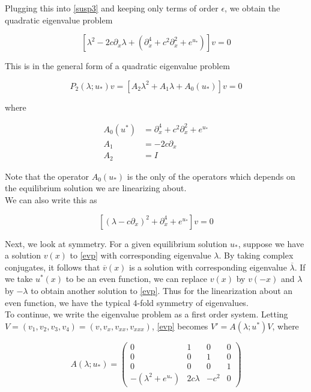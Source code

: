\documentclass[12pt]{article}
\begin{document}
Plugging this into \eqref{susp3} and keeping only terms of order $\epsilon$, we obtain the quadratic eigenvalue problem

\begin{equation}\label{evp}
[\lambda^2 - 2 c \partial_x \lambda + (\partial_x^4 + c^2 \partial_x^2 + e^{u_*})]v = 0
\end{equation}

This is in the general form of a quadratic eigenvalue problem 

\begin{equation}\label{quadeig}
P_2(\lambda; u_*)v =  [A_2 \lambda^2 + A_1 \lambda + A_0(u_*)]v = 0
\end{equation}

where

\begin{align}
A_0(u^*) &= \partial_x^4 + c^2 \partial_x^2 + e^{u_*} \\
A_1 &= -2 c \partial_x \\
A_2 &= I
\end{align}

Note that the operator $A_0(u_*)$ is the only of the operators which depends on the equilibrium solution we are linearizing about.\\

We can also write this as

\begin{equation}\label{evp2}
[(\lambda - c \partial_x)^2 + \partial_x^4 + e^{u_*}]v = 0
\end{equation}

Next, we look at symmetry. For a given equilibrium solution $u_*$, suppose we have a solution $v(x)$ to \eqref{evp} with corresponding eigenvalue $\lambda$. By taking complex conjugates, it follows that $\overline{v}(x)$ is a solution with corresponding eigenvalue $\overline{\lambda}$. If we take $u^*(x)$ to be an even function, we can replace $v(x)$ by $v(-x)$ and $\lambda$ by $-\lambda$ to obtain another solution to \eqref{evp}. Thus for the linearization about an even function, we have the typical 4-fold symmetry of eigenvalues.\\ 

To continue, we write the eigenvalue problem as a first order system. Letting $V = (v_1, v_2, v_3, v_4) = (v, v_x, v_{xx}, v_{xxx})$, \eqref{evp} becomes $V' = A(\lambda; u^*)V$, where

\begin{equation}\label{evpsystem}
A(\lambda; u_*) = \begin{pmatrix}
0 & 1 & 0 & 0 \\
0 & 0 & 1 & 0 \\
0 & 0 & 0 & 1 \\
-(\lambda^2 + e^{u_*}) & 2 c \lambda & -c^2 & 0 
\end{pmatrix}
\end{equation}
\end{document}
